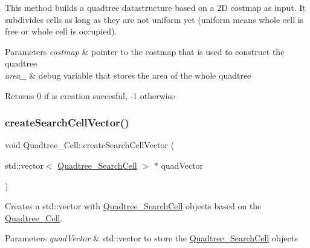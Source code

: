This method builds a quadtree datastructure based on a 2D costmap as input. It subdivides cells as long as they are not uniform yet (uniform means whole cell is free or whole cell is occupied). 


\begin{DoxyParams}{Parameters}
{\em costmap} & pointer to the costmap that is used to construct the quadtree \\
\hline
{\em area\+\_\+} & debug variable that stores the area of the whole quadtree \\
\hline
\end{DoxyParams}
\begin{DoxyReturn}{Returns}
0 if is creation succesful, -\/1 otherwise 
\end{DoxyReturn}
\mbox{\label{classQuadtree__Cell_ae121e7759a290d90f3b4ab12f4460b47}} 
\subsubsection{\texorpdfstring{create\+Search\+Cell\+Vector()}{createSearchCellVector()}}
{\footnotesize\ttfamily void Quadtree\+\_\+\+Cell\+::create\+Search\+Cell\+Vector (\begin{DoxyParamCaption}\item[{std\+::vector$<$ \hyperlink{classQuadtree__SearchCell}{Quadtree\+\_\+\+Search\+Cell} $>$ $\ast$}]{quad\+Vector }\end{DoxyParamCaption})}



Creates a std\+::vector with \hyperlink{classQuadtree__SearchCell}{Quadtree\+\_\+\+Search\+Cell} objects based on the \hyperlink{classQuadtree__Cell}{Quadtree\+\_\+\+Cell}. 


\begin{DoxyParams}{Parameters}
{\em quad\+Vector} & std\+::vector to store the \hyperlink{classQuadtree__SearchCell}{Quadtree\+\_\+\+Search\+Cell} objects \\
\hline
\end{DoxyParams}
\mbox{\label{classQuadtree__Cell_aa3bad1fe80dbfc5b576e63635481e11d}} 
